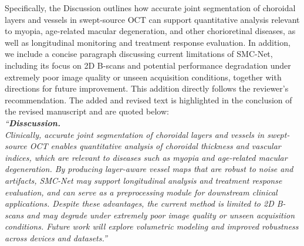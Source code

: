 \documentclass[11pt]{article}
\begin{document}
\begin{enumerate}
{    Specifically, the Discussion outlines how accurate joint segmentation of choroidal layers and vessels in swept-source OCT can support quantitative analysis relevant to myopia, age-related macular degeneration, and other chorioretinal diseases, as well as longitudinal monitoring and treatment response evaluation. In addition, we include a concise paragraph discussing current limitations of SMC-Net, including its focus on 2D B-scans and potential performance degradation under extremely poor image quality or unseen acquisition conditions, together with directions for future improvement. This addition directly follows the reviewer’s recommendation.
    The added and revised text is highlighted in the conclusion of the revised manuscript and are quoted below:\\
    \textit{{\color{blue}``\textbf{Disscussion.}\\
    Clinically, accurate joint segmentation of choroidal layers and vessels in swept-source OCT enables quantitative analysis of choroidal thickness and vascular indices, which are relevant to diseases such as myopia and age-related macular degeneration. By producing layer-aware vessel maps that are robust to noise and artifacts, SMC-Net may support longitudinal analysis and treatment response evaluation, and can serve as a preprocessing module for downstream clinical applications. Despite these advantages, the current method is limited to 2D B-scans and may degrade under extremely poor image quality or unseen acquisition conditions. Future work will explore volumetric modeling and improved robustness across devices and datasets.''}}
    }
\end{enumerate}
\end{document}
